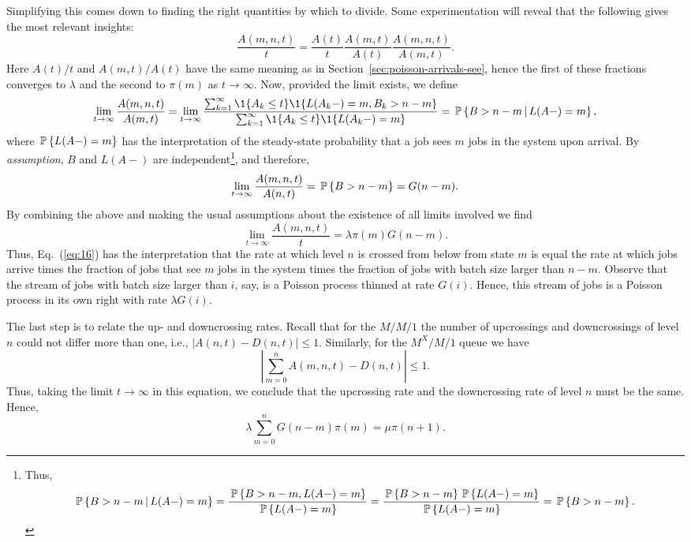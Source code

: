 Simplifying this comes down to finding the right quantities by which
to divide. Some experimentation will reveal that the following gives
the most relevant insights:
\begin{equation}\label{eq:16}
  \frac{A(m,n,t)}t =   \frac{A(t)}t \frac{A(m,t)}{A(t)}\frac{A(m,n,t)}{A(m,t)}.
\end{equation}
Here $A(t)/t$ and $A(m,t)/A(t)$ have the same meaning as in
Section~\ref{sec:poisson-arrivals-see}, hence the first of these
fractions converges to $\lambda$ and the second to $\pi(m)$ as
$t\to\infty$. Now, provided the limit exists, we define
\begin{equation}\label{eq:1332}
\lim_{t\to\infty} \frac{A(m,n,t)}{A(m,t)} = 
\lim_{t\to\infty} \frac{\sum_{k=1}^\infty \1{A_k \leq t}\1{L(A_k-) = m, B_k > n-m}}
{\sum_{k=1}^\infty \1{A_k \leq t}\1{L(A_k-) = m}}=\P{B>n-m\given L(A-)=m},
\end{equation}
where $\P{L(A-)=m}$ has the interpretation of the steady-state
probability that a job sees $m$ jobs in the system upon arrival.  By
\emph{assumption}, $B$ and $L(A-)$ are independent\footnote{Thus, 
\begin{equation*}
\P{B>n-m\given L(A-)=m} =
\frac{\P{B>n-m,L(A-)=m}}{\P{L(A-)=m}}=
\frac{\P{B>n-m}\P{L(A-)=m}}{\P{L(A-)=m}} = \P{B>n-m}.
\end{equation*}
}, and therefore,
\begin{equation*}
\lim_{t\to\infty} \frac{A(m,n,t)}{A(n,t)} = \P{B>n-m} = G(n-m).
\end{equation*} 
By combining the above and making the usual assumptions about the
existence of all limits involved we find
\begin{equation*}
\lim_{t\to\infty}   \frac{A(m,n,t)}t = \lambda \pi(m) G(n-m).
\end{equation*}
Thus, Eq.~(\ref{eq:16}) has the interpretation that the rate at which
level $n$ is crossed from below from state $m$ is equal the rate at
which jobs arrive times the fraction of jobs that see $m$ jobs in the
system times the fraction of jobs with batch size larger than $n-m$.
Observe that the stream of jobs with batch size larger than $i$, say,
is a Poisson process thinned at rate $G(i)$. Hence, this stream of
jobs is a Poisson process in its own right with rate $\lambda G(i)$.


The last step is to relate the up- and downcrossing rates.  Recall
that for the $M/M/1$ the number of upcrossings and downcrossings of
level $n$ could not differ more than one, i.e.,
$|A(n,t)-D(n,t)|\leq 1$. Similarly, for the $M^X/M/1$ queue we have
 \begin{equation}\label{eq:53}
 \left|  \sum_{m=0}^n A(m,n,t) - D(n,t) \right|\leq1.
\end{equation}
Thus, taking the limit $t\to\infty$ in this equation, we conclude that
the upcrossing rate and the downcrossing rate of level $n$ must be the
same. Hence,
\begin{equation}\label{eq:42}
\lambda  \sum_{m=0}^n G(n-m) \pi(m) = \mu \pi(n+1).
\end{equation}


